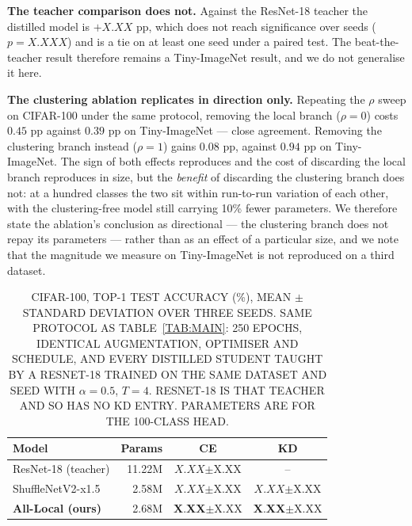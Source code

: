 \textbf{The teacher comparison does not.} Against the ResNet-18 teacher the
distilled model is $+X.XX$ pp, which does not reach significance over seeds
($p = X.XXX$) and is a tie on at least one seed under a paired test. The
beat-the-teacher result therefore remains a Tiny-ImageNet result, and we do
not generalise it here.

\textbf{The clustering ablation replicates in direction only.} Repeating the
$\rho$ sweep on CIFAR-100 under the same protocol, removing the local branch
($\rho = 0$) costs $0.45$ pp against $0.39$ pp on Tiny-ImageNet --- close
agreement. Removing the clustering branch instead ($\rho = 1$) gains $0.08$ pp,
against $0.94$ pp on Tiny-ImageNet. The sign of both effects reproduces and the
cost of discarding the local branch reproduces in size, but the \emph{benefit}
of discarding the clustering branch does not: at a hundred classes the two
sit within run-to-run variation of each other, with the clustering-free model
still carrying 10\% fewer parameters. We therefore state the ablation's
conclusion as directional --- the clustering branch does not repay its
parameters --- rather than as an effect of a particular size, and we note that
the magnitude we measure on Tiny-ImageNet is not reproduced on a third dataset.

\begin{table}[!t]
\renewcommand{\arraystretch}{1.15}
\caption{\uppercase{CIFAR-100, top-1 test accuracy (\%), mean $\pm$ standard
deviation over three seeds. Same protocol as Table~\ref{tab:main}: 250 epochs,
identical augmentation, optimiser and schedule, and every distilled student
taught by a ResNet-18 trained on the same dataset and seed with
$\alpha = 0.5$, $T = 4$. ResNet-18 is that teacher and so has no KD entry.
Parameters are for the 100-class head.}}
\label{tab:cifar100}
\centering
\footnotesize
\begin{tabular}{@{}lrcc@{}}
\toprule
Model & Params & CE & KD \\
\midrule
ResNet-18 (teacher) \cite{resnet} & 11.22M & $X.XX${\scriptsize$\pm$X.XX} & -- \\
ShuffleNetV2-x1.5 \cite{shufflenetv2} & 2.58M & $X.XX${\scriptsize$\pm$X.XX} & $X.XX${\scriptsize$\pm$X.XX} \\
\midrule
\textbf{All-Local (ours)} & 2.68M & $\mathbf{X.XX}${\scriptsize$\pm$X.XX} & $\mathbf{X.XX}${\scriptsize$\pm$X.XX} \\
\bottomrule
\end{tabular}
\end{table}

